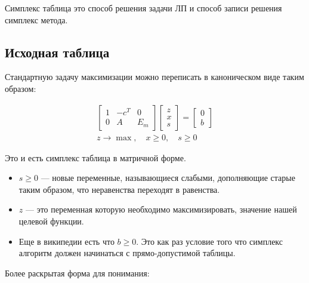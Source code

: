 \documentclass[a4paper,article,14pt]{extarticle}
\begin{document}
Симплекс таблица это способ решения задачи ЛП и способ записи решения симплекс метода.

\subsection{Исходная таблица}

Стандартную задачу максимизации можно переписать в каноническом виде таким образом:

\begin{equation} \label{eq:matrix_form_1_phaze}
    \begin{gathered}
        \begin{bmatrix}
            1 & -c^T & 0 \\
            0 & A & E_m
        \end{bmatrix}
        \begin{bmatrix}
            z \\ x \\ s
        \end{bmatrix}
        =
        \begin{bmatrix}
            0 \\ b
        \end{bmatrix}
        \\
        z \rightarrow \max, \quad x \ge 0, \quad s \ge 0
    \end{gathered}
\end{equation}

Это и есть симплекс таблица в матричной форме.

\begin{itemize}
    \item \(s \ge 0\) --- новые переменные, называющиеся слабыми, дополняющие старые таким образом, что неравенства переходят в равенства.
    \item \(z\) --- это переменная которую необходимо максимизировать, значение нашей целевой функции.
    \item
        Еще в википедии есть что \(b \ge 0\).
        Это как раз условие того что симплекс алгоритм должен начинаться с прямо-допустимой таблицы.
\end{itemize}

Более раскрытая форма для понимания:
\end{document}
